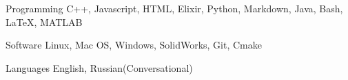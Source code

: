 

\begin{cvskills}

  \cvskill
    {Programming} %
    {C++, Javascript, HTML, Elixir, Python, Markdown, Java, Bash, LaTeX, MATLAB} %

  \cvskill
    {Software} %
    {Linux, Mac OS, Windows, SolidWorks, Git, Cmake} %

  \cvskill
    {Languages} %
    {English, Russian(Conversational)} %

\end{cvskills}
